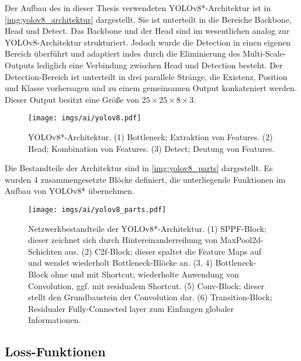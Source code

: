 Der Aufbau des in dieser Thesis verwendeten YOLOv8*-Architektur ist in \autoref{img:yolov8_architektur} dargestellt. Sie ist unterteilt in die Bereiche Backbone, Head und Detect. Das Backbone und der Head sind im wesentlichen analog zur YOLOv8-Architektur strukturiert. Jedoch wurde die Detection in einen eigenen Bereich überführt und adaptiert indes durch die Eliminierung des Multi-Scale-Outputs lediglich eine Verbindung zwischen Head und Detection besteht. Der Detection-Bereich ist unterteilt in drei parallele Stränge, die Existenz, Position und Klasse vorhersagen und zu einem gemeinsamen Output konkateniert werden. Dieser Output besitzt eine Größe von $25 \times 25 \times 8 \times 3$.

\begin{figure}
    \centering
    \texttt{[image: imgs/ai/yolov8.pdf]}
    \caption{YOLOv8*-Architektur. (1) Bottleneck; Extraktion von Features. (2) Head; Kombination von Features. (3) Detect; Deutung von Features.}
    \label{img:yolov8_architektur}
\end{figure}

Die Bestandteile der Architektur sind in \autoref{img:yolov8_parts} dargestellt. Es wurden 4 zusammengesetzte Blöcke definiert, die unterliegende Funktionen im Aufbau von YOLOv8* übernehmen.

\begin{figure}
    \centering
    \texttt{[image: imgs/ai/yolov8\_parts.pdf]}
    \caption{Netzwerkbestandteile der YOLOv8*-Architektur. (1) SPPF-Block; dieser zeichnet sich durch Hintereinanderreihung von MaxPool2d-Schichten aus. (2) C2f-Block; dieser spaltet die Feature Maps auf und wendet wiederholt Bottleneck-Blöcke an. (3, 4) Bottleneck-Block ohne und mit Shortcut; wiederholte Anwendung von Convolution, ggf. mit residualem Shortcut. (5) Conv-Block; dieser stellt den Grundbaustein der Convolution dar. (6) Transition-Block; Residualer Fully-Connected layer zum Einfangen globaler Informationen.}
    \label{img:yolov8_parts}
\end{figure}


\subsection{Loss-Funktionen}
\label{sec:losses}


